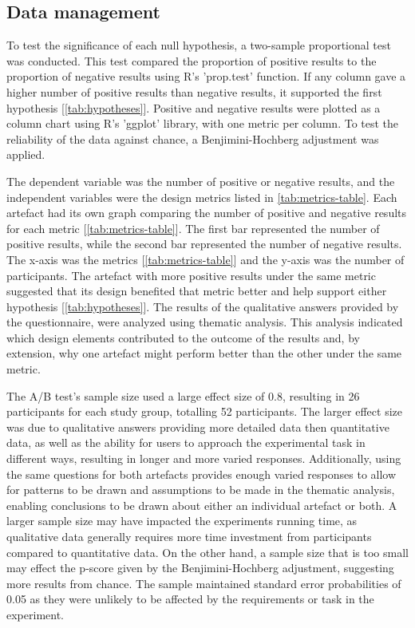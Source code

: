 \documentclass[article]{IEEEtran}
\begin{document}
        \subsection{Data management}
            To test the significance of each null hypothesis, a two-sample proportional test was conducted. This test compared the proportion of positive results to the proportion of negative results using R's 'prop.test' function. If any column gave a higher number of positive results than negative results, it supported the first hypothesis [\autoref{tab:hypotheses}]. Positive and negative results were plotted as a column chart using R's 'ggplot' library, with one metric per column. To test the reliability of the data against chance, a Benjimini-Hochberg adjustment was applied.

            The dependent variable was the number of positive or negative results, and the independent variables were the design metrics listed in \autoref{tab:metrics-table}. Each artefact had its own graph comparing the number of positive and negative results for each metric [\autoref{tab:metrics-table}]. The first bar represented the number of positive results, while the second bar represented the number of negative results. The x-axis was the metrics [\autoref{tab:metrics-table}] and the y-axis was the number of participants. The artefact with more positive results under the same metric suggested that its design benefited that metric better and help support either hypothesis [\autoref{tab:hypotheses}]. The results of the qualitative answers provided by the questionnaire, were analyzed using thematic analysis. This analysis indicated which design elements contributed to the outcome of the results and, by extension, why one artefact might perform better than the other under the same metric.

            The A/B test's sample size used a large effect size of 0.8, resulting in 26 participants for each study group, totalling 52 participants. The larger effect size was due to qualitative answers providing more detailed data then quantitative data, as well as the ability for users to approach the experimental task in different ways, resulting in longer and more varied responses. Additionally, using the same questions for both artefacts provides enough varied responses to allow for patterns to be drawn and assumptions to be made in the thematic analysis, enabling conclusions to be drawn about either an individual artefact or both. A larger sample size may have impacted the experiments running time, as qualitative data generally requires more time investment from participants compared to quantitative data. On the other hand, a sample size that is too small may effect the p-score given by the Benjimini-Hochberg adjustment, suggesting more results from chance. The sample maintained standard error probabilities of 0.05 as they were unlikely to be affected by the requirements or task in the experiment.
            
\end{document}
